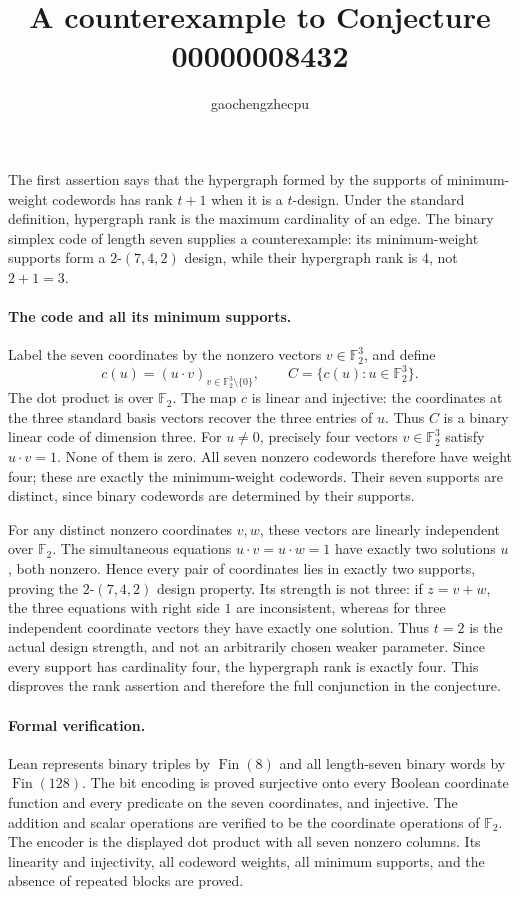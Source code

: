 \documentclass[11pt]{article}
\title{A counterexample to Conjecture 00000008432}
\author{gaochengzhecpu}
\date{}
\begin{document}
\maketitle

The first assertion says that the hypergraph formed by the supports of
minimum-weight codewords has rank $t+1$ when it is a $t$-design. Under the
standard definition, hypergraph rank is the maximum cardinality of an edge.
The binary simplex code of length seven supplies a counterexample: its
minimum-weight supports form a $2$-$(7,4,2)$ design, while their hypergraph
rank is $4$, not $2+1=3$.

\paragraph{The code and all its minimum supports.}
Label the seven coordinates by the nonzero vectors $v\in\mathbb F_2^3$,
and define
\[c(u)=(u\cdot v)_{v\in\mathbb F_2^3\setminus\{0\}},\qquad
 C=\{c(u):u\in\mathbb F_2^3\}.\]
The dot product is over $\mathbb F_2$. The map $c$ is linear and injective:
the coordinates at the three standard basis vectors recover the three
entries of $u$. Thus $C$ is a binary linear code of dimension three.
For $u\ne0$, precisely four vectors $v\in\mathbb F_2^3$ satisfy
$u\cdot v=1$. None of them is zero. All seven nonzero codewords therefore
have weight four; these are exactly the minimum-weight codewords. Their
seven supports are distinct, since binary codewords are determined by
their supports.

For any distinct nonzero coordinates $v,w$, these vectors are linearly
independent over $\mathbb F_2$. The simultaneous equations
$u\cdot v=u\cdot w=1$ have exactly two solutions $u$, both nonzero. Hence
every pair of coordinates lies in exactly two supports, proving the
$2$-$(7,4,2)$ design property. Its strength is not three: if $z=v+w$, the
three equations with right side $1$ are inconsistent, whereas for three
independent coordinate vectors they have exactly one solution. Thus $t=2$
is the actual design strength, and not an arbitrarily chosen weaker
parameter. Since every support has cardinality four, the hypergraph rank
is exactly four. This disproves the rank assertion and therefore the full
conjunction in the conjecture.

\paragraph{Formal verification.}
Lean represents binary triples by $\operatorname{Fin}(8)$ and all length-seven
binary words by $\operatorname{Fin}(128)$. The bit encoding is proved
surjective onto every Boolean coordinate function and every predicate on
the seven coordinates, and injective. The addition and scalar operations
are verified to be the coordinate operations of $\mathbb F_2$.
The encoder is the displayed dot product with all seven nonzero columns.
Its linearity and injectivity, all codeword weights, all minimum supports,
and the absence of repeated blocks are proved.
\end{document}
